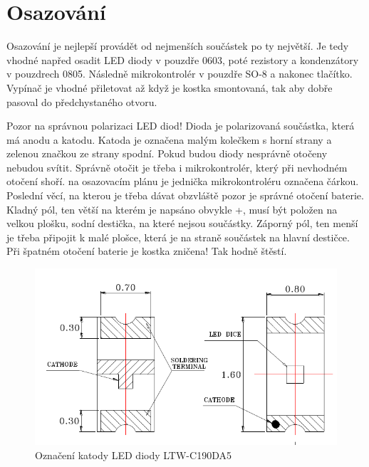\section*{Osazování}

Osazování je nejlepší provádět od nejmenších součástek po ty největší. Je tedy vhodné napřed osadit LED diody v pouzdře 0603, poté rezistory a kondenzátory v pouzdrech 0805. Následně mikrokontrolér v pouzdře SO-8 a nakonec tlačítko. Vypínač je vhodné přiletovat až když je kostka smontovaná, tak aby dobře pasoval do předchystaného otvoru.

Pozor na správnou polarizaci LED diod! Dioda je polarizovaná součástka, která má anodu a katodu. Katoda je označena malým kolečkem s horní strany a zelenou značkou ze strany spodní. Pokud budou diody nesprávně otočeny nebudou svítit. Správně otočit je třeba i mikrokontrolér, který při nevhodném otočení shoří. na osazovacím plánu je jednička mikrokontroléru označena čárkou. Poslední věcí, na kterou je třeba dávat obzvláště pozor je správné otočení baterie. Kladný pól, ten větší na kterém je napsáno obvykle +, musí být položen na velkou plošku, sodní destička, na které nejsou součástky. Záporný pól, ten menší je třeba připojit k malé plošce, která je na straně součástek na hlavní destičce. Při špatném otočení baterie je kostka zničena! Tak hodně štěstí.

\begin{figure}[H]
  \centering
  \includegraphics[width=\textwidth]{../img/LED.pdf}
  \caption{Označení katody LED diody LTW-C190DA5}
  \label{img:1}
\end{figure}